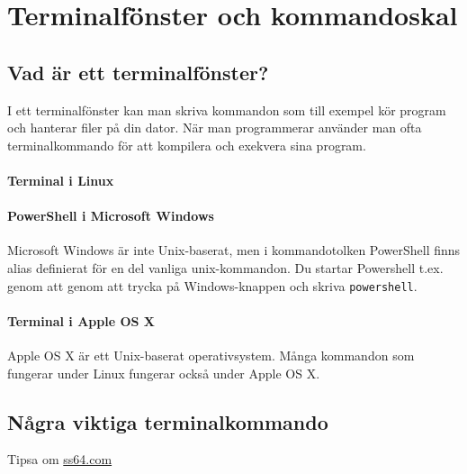 
\chapter{Terminalfönster och kommandoskal}\label{appendix:terminal}

\section{Vad är ett terminalfönster?}

I ett terminalfönster kan man skriva kommandon som till exempel kör program och hanterar filer på din dator. När man programmerar använder man ofta terminalkommando för att kompilera och exekvera sina program.   
 
\subsubsection{Terminal i Linux}

\subsubsection{PowerShell i Microsoft Windows}
Microsoft Windows är inte Unix-baserat, men i kommandotolken PowerShell finns alias definierat för en del vanliga unix-kommandon. Du startar Powershell t.ex. genom att genom att trycka på Windows-knappen och skriva \texttt{powershell}.

\subsubsection{Terminal i Apple OS X}
Apple OS X är ett Unix-baserat operativsystem. Många kommandon som fungerar under Linux fungerar också under Apple OS X.

\section{Några viktiga terminalkommando}

Tipsa om \href{http://ss64.com/}{ss64.com}
